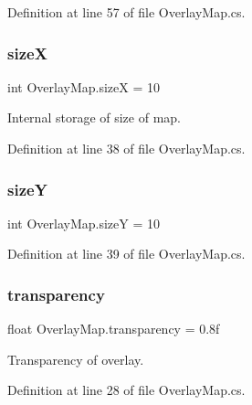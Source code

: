 Definition at line 57 of file Overlay\+Map.\+cs.

\mbox{\label{class_overlay_map_a45e5684142986bdb03421c4cb5f6a102}} 
\subsubsection{\texorpdfstring{sizeX}{sizeX}}
{\footnotesize\ttfamily int Overlay\+Map.\+sizeX = 10}



Internal storage of size of map. 



Definition at line 38 of file Overlay\+Map.\+cs.

\mbox{\label{class_overlay_map_a41ca1be6bb50efb0ed8a8df74aabad96}} 
\subsubsection{\texorpdfstring{sizeY}{sizeY}}
{\footnotesize\ttfamily int Overlay\+Map.\+sizeY = 10}



Definition at line 39 of file Overlay\+Map.\+cs.

\mbox{\label{class_overlay_map_ad6d2516e0f0bdaf19f8639191668e91f}} 
\subsubsection{\texorpdfstring{transparency}{transparency}}
{\footnotesize\ttfamily float Overlay\+Map.\+transparency = 0.\+8f}



Transparency of overlay. 



Definition at line 28 of file Overlay\+Map.\+cs.

\mbox{\label{class_overlay_map_a9fb8c6f87fac7a1010b382376cac3fd5}} 
